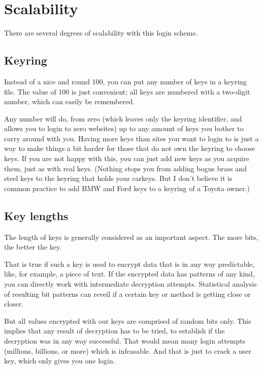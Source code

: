 \section{Scalability}
There are several degrees of scalability with this login scheme.
\subsection{Keyring}
Instead of a nice and round 100,
you can put any number of keys in a keyring file.
The value of 100 is just convenient;
all keys are numbered with a two-digit number,
which can easily be remembered.
\par
Any number will do,
from zero
(which leaves only the keyring identifier,
and allows you to login to zero websites)
up to any amount of keys you bother to carry around with you.
Having more keys than sites you want to login to is just a way to make things a bit harder for those that do not own the keyring to choose keys.
If you are not happy with this,
you can just add new keys as you acquire them,
just as with real keys.
(Nothing stops you from adding bogus brass and steel keys to the keyring that holds your carkeys.
But I don't believe it is common practice to add BMW and Ford keys to a keyring of a Toyota owner.)
\subsection{Key lengths}
\label{sec:key_length}
The length of keys is generally considered as an important aspect.
The more bits, the better the key.
\par
That is true if such a key is used to encrypt data that is in any way predictable,
like, for example, a piece of text.
If the encrypted data has patterns of any kind,
you can directly work with intermediate decryption attempts.
Statistical analysis of resulting bit patterns can reveil if a certain key or method is getting close or closer.
\par
But all values encrypted with our keys are comprised of random bits only.
This implies that any result of decryption has to be tried,
to establish if the decryption was in any way successful.
That would mean many login attempts
(millions, billions, or more)
which is infeasable.
And that is just to crack a user key,
which only gives you one login.
